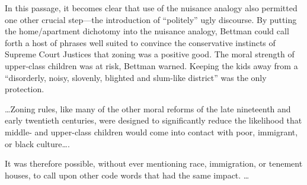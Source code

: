 In this passage, it becomes clear that use of the nuisance analogy also
permitted one other crucial step---the introduction of ``politely'' ugly
discourse. By putting the home/apartment dichotomy into the nuisance analogy,
Bettman could call forth a host of phrases well suited to convince the
conservative instincts of Supreme Court Justices that zoning was a positive
good. The moral strength of upper-class children was at risk, Bettman warned.
Keeping the kids away from a ``disorderly, noisy, slovenly, blighted and
slum-like district'' was the only protection.

\ldots Zoning rules, like many of the other moral reforms of the late nineteenth
and early twentieth centuries, were designed to significantly reduce the
likelihood that middle- and upper-class children would come into contact with
poor, immigrant, or black culture\ldots .

It was therefore possible, without ever mentioning race, immigration, or
tenement houses, to call upon other code words that had the same impact. \ldots

